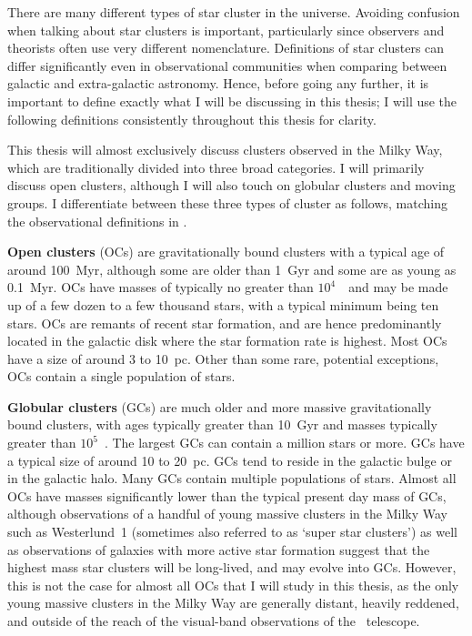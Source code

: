 There are many different types of star cluster in the universe. Avoiding confusion when talking about star clusters is important, particularly since observers and theorists often use very different nomenclature. Definitions of star clusters can differ significantly even in observational communities when comparing between galactic and extra-galactic astronomy. Hence, before going any further, it is important to define exactly what I will be discussing in this thesis; I will use the following definitions consistently throughout this thesis for clarity.

This thesis will almost exclusively discuss clusters observed in the Milky Way, which are traditionally divided into three broad categories. I will primarily discuss open clusters, although I will also touch on globular clusters and moving groups. I differentiate between these three types of cluster as follows, matching the observational definitions in \cite{portegies_zwart_young_2010}.

\textbf{Open clusters} (OCs) are gravitationally bound clusters with a typical age of around 100~Myr, although some are older than 1~Gyr and some are as young as 0.1~Myr. OCs have masses of typically no greater than $10^4$~\MSun\ and may be made up of a few dozen to a few thousand stars, with a typical minimum being ten stars. OCs are remants of recent star formation, and are hence predominantly located in the galactic disk where the star formation rate is highest. Most OCs have a size of around 3 to 10~pc. Other than some rare, potential exceptions, OCs contain a single population of stars.

\textbf{Globular clusters} (GCs) are much older and more massive gravitationally bound clusters, with ages typically greater than 10~Gyr and masses typically greater than $10^5$~\MSun. The largest GCs can contain a million stars or more. GCs have a typical size of around 10 to 20~pc. GCs tend to reside in the galactic bulge or in the galactic halo. Many GCs contain multiple populations of stars. Almost all OCs have masses significantly lower than the typical present day mass of GCs, although observations of a handful of young massive clusters in the Milky Way such as Westerlund~1 (sometimes also referred to as `super star clusters') as well as observations of galaxies with more active star formation suggest that the highest mass star clusters will be long-lived, and may evolve into GCs. However, this is not the case for almost all OCs that I will study in this thesis, as the only young massive clusters in the Milky Way are generally distant, heavily reddened, and outside of the reach of the visual-band observations of the \gaia\ telescope.

